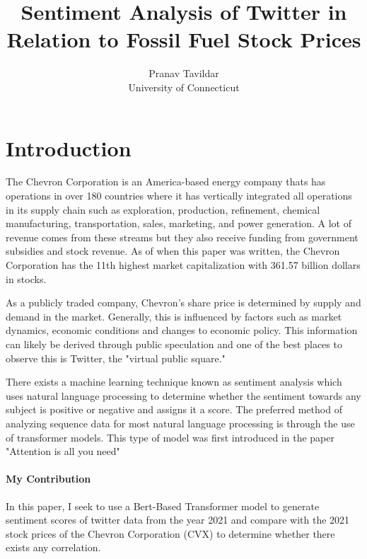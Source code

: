 \documentclass[12pt]{article}
\title{Sentiment Analysis of Twitter in Relation to Fossil Fuel Stock Prices}
\author{Pranav Tavildar\\
  University of Connecticut
}
\begin{document}
\maketitle

\section{Introduction}

	The Chevron Corporation is an America-based energy company thats has operations in over 180 countries where it has vertically integrated all operations in its supply chain such as exploration, production, refinement, chemical manufacturing, transportation, sales, marketing, and power generation. A lot of revenue comes from these streams but they also receive funding from government subsidies and stock revenue. As of when this paper was written, the Chevron Corporation has the 11th highest market capitalization with 361.57 billion dollars in stocks.
	
	As a publicly traded company, Chevron's share price is determined by supply and demand in the market. Generally, this is influenced by factors such as market dynamics, economic conditions and changes to economic policy. This information can likely be derived through public speculation and one of the best places to observe this is Twitter, the "virtual public square."
	
	There exists a machine learning technique known as sentiment analysis which uses natural language processing to determine whether the sentiment towards any subject is positive or negative and assigns it a score. The preferred method of analyzing sequence data for most natural language processing is through the use of transformer models. This type of model was first introduced in the paper "Attention is all you need" \cite{}
\paragraph{My Contribution}
	In this paper, I seek to use a Bert-Based Transformer model to generate sentiment scores of twitter data from the year 2021 and compare with the 2021 stock prices of the Chevron Corporation (CVX) to determine whether there exists any correlation. 
\end{document}

